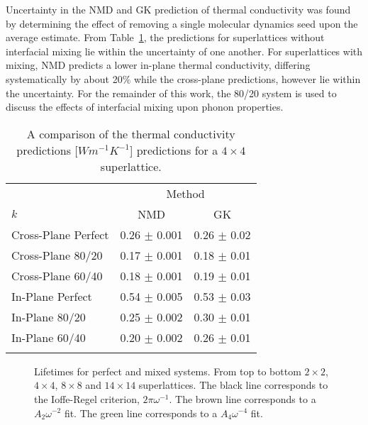 \documentclass[aps,prb,preprint,preprintnumbers,amsmath,amssymb,floatfix,superscriptaddress]{revtex4}
\begin{document}
Uncertainty in the NMD and GK prediction of thermal conductivity was found by determining the effect of removing a single molecular dynamics seed upon the average estimate. From Table~\ref{TB:validate}, the predictions for superlattices without interfacial mixing lie within the uncertainty of one another. For superlattices with mixing, NMD predicts a lower in-plane thermal conductivity, differing systematically by about 20\% while the cross-plane predictions, however lie within the uncertainty. For the remainder of this work, the 80/20 system is used to discuss the effects of interfacial mixing upon phonon properties.
\begin{table}
\begin{center}
\begin{tabular}{lcc}
\hline\noalign{\smallskip}
&\multicolumn{2}{c}{Method} \\
\cline{2-3}\noalign{\smallskip}
$k$ & NMD  & GK  \\
\noalign{\smallskip}\hline\noalign{\smallskip}
Cross-Plane Perfect  & 0.26 $\pm$ 0.001& 0.26 $\pm$ 0.02\\
Cross-Plane 80/20    & 0.17  $\pm$ 0.001   &   0.18 $\pm$ 0.01 \\
Cross-Plane 60/40    & 0.18  $\pm$ 0.001   &   0.19 $\pm$ 0.01 \\
In-Plane Perfect   & 0.54 $\pm$ 0.005 & 0.53 $\pm$ 0.03  \\
In-Plane 80/20  & 0.25 $\pm$ 0.002 & 0.30 $\pm$ 0.01  \\
In-Plane 60/40   & 0.20 $\pm$ 0.002 & 0.26 $\pm$ 0.01  \\
\noalign{\smallskip}\hline
\end{tabular}
\end{center}
\renewcommand{\table}{Table.}
\caption{A comparison of the thermal conductivity predictions [$Wm^{-1}K^{-1}$] predictions for a $4\times4$ superlattice.}
\label{TB:validate}
\end{table}
\renewcommand{\textfraction}{0.0}
\begin{figure}%
\begin{center}
\renewcommand{\figure}{Fig.}
\caption{Lifetimes for perfect and mixed systems. From top to bottom $2\times2$, $4\times4$, $8\times8$ and $14\times14$ superlattices. The black line corresponds to the Ioffe-Regel criterion, $2\pi\omega^{-1}$. The brown line corresponds to a $A_2\omega^{-2}$ fit. The green line corresponds to a $A_4\omega^{-4}$ fit.}
\label{FIG:lifetime}
\end{center}
\end{figure}
\end{document}
